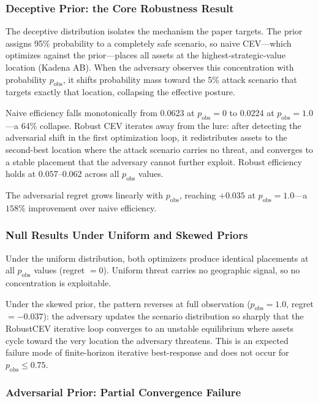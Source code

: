 \documentclass[11pt]{article}
\begin{document}
\subsubsection{Deceptive Prior: the Core Robustness Result}

The deceptive distribution isolates the mechanism the paper targets.
The prior assigns 95\% probability to a completely safe scenario, so
naive CEV—which optimizes against the prior—places all assets at the
highest-strategic-value location (Kadena AB).  When the adversary
observes this concentration with probability $p_\mathrm{obs}$, it shifts
probability mass toward the 5\% attack scenario that targets exactly that
location, collapsing the effective posture.

Naive efficiency falls monotonically from 0.0623 at $p_\mathrm{obs} = 0$
to 0.0224 at $p_\mathrm{obs} = 1.0$---a 64\% collapse.  Robust CEV
iterates away from the lure: after detecting the adversarial shift in the
first optimization loop, it redistributes assets to the second-best
location where the attack scenario carries no threat, and converges to a
stable placement that the adversary cannot further exploit.
Robust efficiency holds at $0.057$--$0.062$ across all $p_\mathrm{obs}$
values.

The adversarial regret grows linearly with $p_\mathrm{obs}$, reaching
$+0.035$ at $p_\mathrm{obs} = 1.0$---a $158\%$ improvement over naive
efficiency.

\subsubsection{Null Results Under Uniform and Skewed Priors}

Under the uniform distribution, both optimizers produce identical placements
at all $p_\mathrm{obs}$ values (regret $= 0$).  Uniform threat carries
no geographic signal, so no concentration is exploitable.

Under the skewed prior, the pattern reverses at full observation
($p_\mathrm{obs} = 1.0$, regret $= -0.037$): the adversary updates the
scenario distribution so sharply that the RobustCEV iterative loop
converges to an unstable equilibrium where assets cycle toward the
very location the adversary threatens.  This is an expected failure mode
of finite-horizon iterative best-response and does not occur for
$p_\mathrm{obs} \leq 0.75$.

\subsubsection{Adversarial Prior: Partial Convergence Failure}
\end{document}
